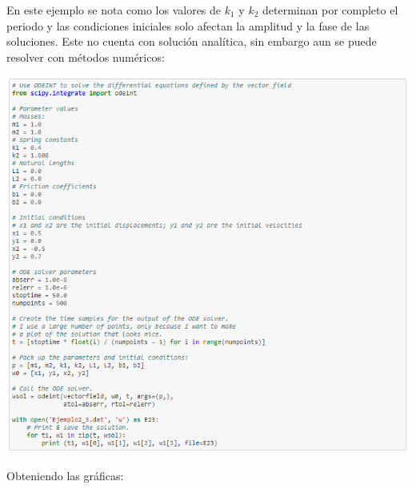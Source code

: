 \documentclass{article}
\begin{document}
En este ejemplo se nota como los valores de $k_{1}$ y $k_{2}$ determinan por completo el periodo y las condiciones iniciales solo afectan la amplitud y la fase de las soluciones. Este no cuenta con solución analítica, sin embargo aun se puede resolver con métodos numéricos:
\begin{center}
    \includegraphics[width=.9\textwidth]{Datos3.PNG}
\end{center}
Obteniendo las gráficas:
\end{document}
